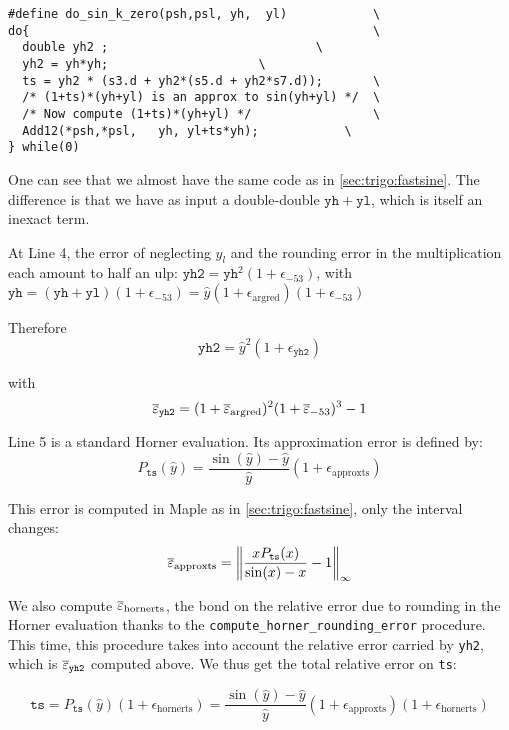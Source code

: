 \begin{lstlisting}[caption={do\_sin\_k\_zero},firstnumber=1]
#define do_sin_k_zero(psh,psl, yh,  yl)            \
do{                                                \
  double yh2 ;	              			   \
  yh2 = yh*yh;					   \
  ts = yh2 * (s3.d + yh2*(s5.d + yh2*s7.d));	   \
  /* (1+ts)*(yh+yl) is an approx to sin(yh+yl) */  \
  /* Now compute (1+ts)*(yh+yl) */                 \
  Add12(*psh,*psl,   yh, yl+ts*yh);	           \
} while(0)						   
\end{lstlisting}

One can see that we almost have the same code as in
\ref{sec:trigo:fastsine}. The difference is that we have as input
a double-double $\mathtt{yh}+\mathtt{yl}$, which is itself an inexact term. 

At Line 4, the error of neglecting $y_l$ and the rounding error in the
multiplication each amount to half an ulp:
  $\mathtt{yh2}=\mathtt{yh}^2(1+\epsilon_{-53})$, 
 with $\mathtt{yh} = (\mathtt{yh}+\mathtt{yl})(1+\epsilon_{-53}) = \hat{y}(1+\epsilon_{\mathrm{argred}})(1+\epsilon_{-53})$

Therefore
\begin{equation}
  \mathtt{yh2}=\hat{y}^2(1+\epsilon_{\mathtt{yh2}})
\end{equation}

with
\begin{equation}
  {\overline{\varepsilon}}_{\mathtt{yh2}} = (1+{\overline{\varepsilon}}_{\mathrm{argred}})^2(1+{\overline{\varepsilon}}_{-53})^3 - 1
\end{equation}

Line 5 is a standard Horner evaluation. Its approximation error is defined by: 
$$
P_{\mathtt{ts}}(\hat{y}) = \frac{\sin(\hat{y})-\hat{y}}{\hat{y}}(1+\epsilon_{\mathrm{approxts}})
$$

This error is computed in Maple as in \ref{sec:trigo:fastsine}, only the interval changes:
$${\overline{\varepsilon}}_{\mathrm{approxts}} = \left\Vert \frac{xP_{\mathtt{ts}}(x)}{\sin(x)-x} -1 \right\Vert_{\infty}$$

We also compute ${\overline{\varepsilon}}_{\mathrm{hornerts}}$, the bond on the relative error due
to rounding in the Horner evaluation thanks to the
\texttt{compute\_horner\_rounding\_error} procedure. This time, this procedure 
takes into account the relative error carried by \texttt{yh2}, which is
${\overline{\varepsilon}}_{\mathtt{yh2}}$ computed above.
We thus get the total relative error on \texttt{ts}:

\begin{equation}
  \mathtt{ts} = P_{\mathtt{ts}}(\hat{y})(1+\epsilon_{\mathrm{hornerts}}) = \frac{\sin(\hat{y})-\hat{y}}{\hat{y}}(1+\epsilon_{\mathrm{approxts}})(1+\epsilon_{\mathrm{hornerts}})
  \label{eq:sink0ts}
\end{equation}

